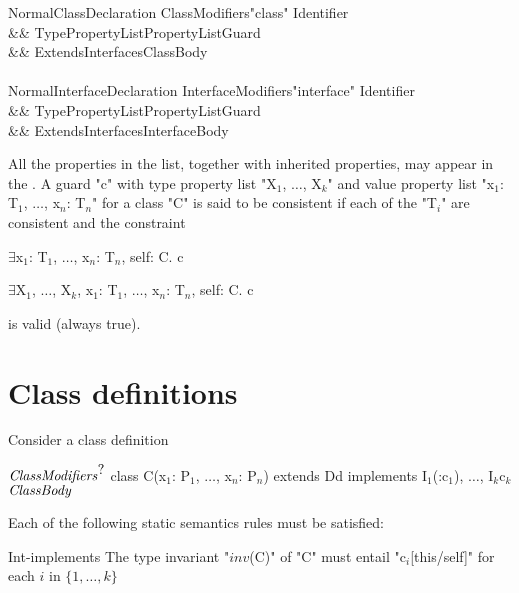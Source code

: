 \else

\begin{grammar}
NormalClassDeclaration \:
      ClassModifiers\opt \xcd"class" Identifier  \\
   && TypePropertyList\opt PropertyList\opt Guard\opt \\
   && Extends\opt Interfaces\opt ClassBody \\
\\
NormalInterfaceDeclaration \:
      InterfaceModifiers\opt \xcd"interface" Identifier  \\
   && TypePropertyList\opt PropertyList\opt Guard\opt \\
   && ExtendsInterfaces\opt InterfaceBody \\
\end{grammar}

\fi

All the properties in the list, together with inherited properties,
may appear in the . A guard \xcd"c" with
\iftypeparams\else
type property list \xcdmath"X$_1$, $\dots$, X$_k$" and
\fi
value property list \xcdmath"x$_1$: T$_1$, $\dots$, x$_n$: T$_n$"
for a class \xcd"C" is said to be consistent if each of the \xcdmath"T$_i$" are
consistent and the constraint
\iftypeparams
\begin{xtenmath}
$\exists$x$_1$: T$_1$, $\dots$, x$_n$: T$_n$, self: C. c
\end{xtenmath}
\else
\begin{xtenmath}
$\exists$X$_1$, $\dots$, X$_k$, x$_1$: T$_1$, $\dots$, x$_n$: T$_n$, self: C. c
\end{xtenmath}
\fi
\noindent is valid (always true).

\section{Class definitions}

Consider a class definition
\begin{xtenmath}
$\mbox{\emph{ClassModifiers}}^{\mbox{?}}$
class C(x$_1$: P$_1$, $\dots$, x$_n$: P$_n$) extends D{d}
   implements I$_1$(:c$_1$), $\dots$, I$_k${c$_k$}
$\mbox{\emph{ClassBody}}$
\end{xtenmath}

Each of the following static semantics rules must be satisfied:

\begin{staticrule}{Int-implements}
The type invariant \xcdmath"$\mathit{inv}$(C)" of \xcd"C" must entail
\xcdmath"c$_i$[this/self]" for each $i$ in $\{1, \dots, k\}$
\end{staticrule}

